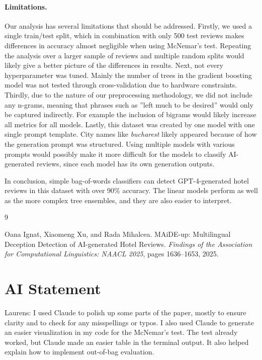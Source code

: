 \documentclass{article}
\begin{document}
\paragraph{Limitations.} 
Our analysis has several limitations that should be addressed. Firstly, we used a single train/test split, which in combination with only 500 test reviews makes differences in accuracy almost negligible when using McNemar's test. Repeating the analysis over a larger sample of reviews and multiple random splits would likely give a better picture of the differences in results. 
Next, not every hyperparameter was tuned. Mainly the number of trees in the gradient boosting model was not tested through cross-validation due to hardware constraints.  
Thirdly, due to the nature of our preprocessing methodology, we did not include any n-grams, meaning that phrases such as ''left much to be desired'' would only be captured indirectly. For example the inclusion of bigrams would likely increase all metrics for all models. 
Lastly, this dataset was created by one model with one single prompt template. City names like \emph{bucharest} likely appeared because of how the generation prompt was structured. Using multiple models with various prompts would possibly make it more difficult for the models to classify AI-generated reviews, since each model has its own generation outputs. 

In conclusion, simple bag-of-words classifiers can detect GPT-4-generated hotel
reviews in this dataset with over 90\% accuracy. The linear models perform as
well as the more complex tree ensembles, and they are also easier to interpret.

\begin{thebibliography}{9}

Oana Ignat, Xiaomeng Xu, and Rada Mihalcea.
\newblock MAiDE-up: Multilingual Deception Detection of AI-generated Hotel Reviews.
\newblock \textit{Findings of the Association for Computational Linguistics: NAACL 2025}, pages 1636--1653, 2025.


\end{thebibliography}

\section{AI Statement}

Laurens: 
I used Claude to polish up some parts of the paper, mostly to ensure clarity and to check for any misspellings or typos. I also used Claude to generate an easier visualization in my code for the McNemar's test. The test already worked, but Claude made an easier table in the terminal output. It also helped explain how to implement out-of-bag evaluation.
\end{document}
